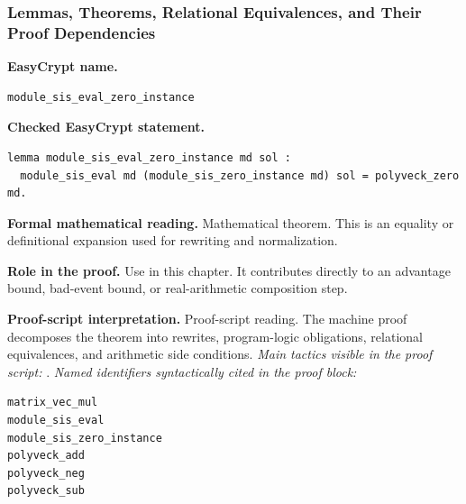 \subsubsection*{Lemmas, Theorems, Relational Equivalences, and Their Proof Dependencies}
\begin{formaltheorem}
\noindent\textbf{EasyCrypt name.}
\begin{lstlisting}[language=EasyCrypt,basicstyle=\ttfamily\scriptsize]
module_sis_eval_zero_instance
\end{lstlisting}
\noindent\textbf{Checked EasyCrypt statement.}
\begin{lstlisting}[language=EasyCrypt,basicstyle=\ttfamily\scriptsize]
lemma module_sis_eval_zero_instance md sol :
  module_sis_eval md (module_sis_zero_instance md) sol = polyveck_zero md.
\end{lstlisting}
\noindent\textbf{Formal mathematical reading.}
Mathematical theorem. This is an equality or definitional expansion used for rewriting and normalization.

\noindent\textbf{Role in the proof.}
Use in this chapter. It contributes directly to an advantage bound, bad-event bound, or real-arithmetic composition step.

\noindent\textbf{Proof-script interpretation.}
Proof-script reading. The machine proof decomposes the theorem into rewrites, program-logic obligations, relational equivalences, and arithmetic side conditions.
\emph{Main tactics visible in the proof script:} .
\emph{Named identifiers syntactically cited in the proof block:}
\begin{lstlisting}[language=EasyCrypt,basicstyle=\ttfamily\scriptsize]
matrix_vec_mul
module_sis_eval
module_sis_zero_instance
polyveck_add
polyveck_neg
polyveck_sub
\end{lstlisting}

\end{formaltheorem}

